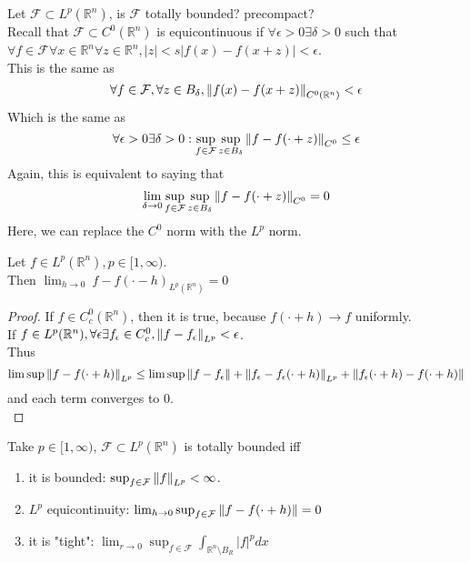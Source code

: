 \documentclass[../main.tex]{subfiles}
\begin{document}
Let $\mathcal{F} \subset L^{p}( \mathbb{R}^n) $, is $ \mathcal{F}$ totally bounded? precompact?\\
Recall that $ \mathcal{F} \subset C^{0}( \mathbb{R}^n) $ is equicontinuous if $\forall \epsilon>0 \exists \delta>0 $ such that $\forall f \in \mathcal{F}\forall x \in \mathbb{R}^n\forall z \in \mathbb{R}^n, |z|<s |f( x)- f( x+z) | < \epsilon$.\\
This is the same as
\[ 
\forall f \in \mathcal{F}, \forall z \in B_\delta, \left\lVert f( x) - f ( x+z) \right\rVert _{C^{0}( \mathbb{R}^n) } < \epsilon
\]
Which is the same as
\[ 
\forall \epsilon>0 \exists \delta>0 : \sup_{f \in \mathcal{F}} \sup_{z\in B_\delta} \left\lVert f - f ( \cdot + z) \right\rVert _{C^{0}} \leq  \epsilon
\]
Again, this is equivalent to saying that
\[ 
\lim_{\delta \to 0} \sup_{f \in \mathcal{F}} \sup_{z \in B_\delta} \left\lVert f - f ( \cdot + z) \right\rVert _{C^{0}} =0
\]
Here, we can replace the $C^{0}$ norm with the $L^{p}$ norm.
\begin{lemma}
Let $f \in L^{p}( \mathbb{R}^n) , p \in [ 1, \infty ) $.\\
Then $ \lim_{h \to 0} \ { f - f( \cdot - h) } _{L^{p}( \mathbb{R}^n) } = 0$ 
\end{lemma}
\begin{proof}
If $f \in C^{0}_c ( \mathbb{R}^n) $, then it is true, because $f( \cdot +h) \to f$ uniformly.\\
If $f \in L^{p}( \mathbb{R}^n), \forall \epsilon \exists f_\epsilon \in C^{0}_c, \left\lVert f-f_\epsilon\right\rVert_{L^{p}} < \epsilon $.\\
Thus
\[ 
\limsup \left\lVert f - f ( \cdot + h) \right\rVert _{L^{p}} \leq \limsup \left\lVert f-f_\epsilon\right\rVert + \left\lVert f_\epsilon - f_\epsilon( \cdot +h) \right\rVert_{L^{p}} + \left\lVert f_\epsilon( \cdot +h) - f( \cdot + h) \right\rVert 
\]
and each term converges to 0.\\

\end{proof}
\begin{thm}
	
Take $p \in [ 1, \infty ) $, $\mathcal{F} \subset L^{p}( \mathbb{R}^n) $ is totally bounded iff
\begin{enumerate}
\item it is bounded: $\sup_{f\in \mathcal{F}} \left\lVert f\right\rVert_{L^{p}} < \infty $.
\item $L^{p}$ equicontinuity: $\lim_{h \to 0} \sup_{f \in \mathcal{F}} \left\lVert f - f( \cdot +h) \right\rVert=0 $ 
\item it is "tight": $\lim_{r \to 0} \sup_{f \in \mathcal{F}} \int_{ \mathbb{R}^n\setminus B_R }^{  }|f|^{p}dx$ 
\end{enumerate}
\end{thm}
\end{document}
